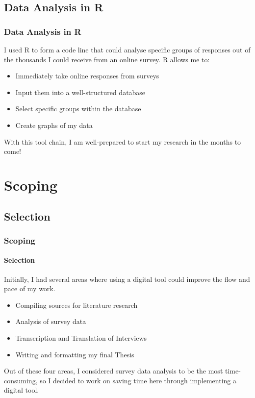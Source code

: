 \documentclass[aspectratio=1610]{beamer}
\begin{document}
\subsection{Data Analysis in R}
\begin{frame}
\frametitle{Data Analysis in R}
I used R to form a code line that could analyse specific groups of responses out of the thousands I could receive from an online survey.
R allows me to:
\begin{itemize}
\item Immediately take online responses from surveys
\item Input them into a well-structured database
\item Select specific groups within the database
\item Create graphs of my data
\end{itemize}
With this tool chain, I am well-prepared to start my research in the months to come!
 \end{frame}
\section{Scoping}
\subsection{Selection}
\begin{frame}
\frametitle{Scoping}
\framesubtitle{Selection}
Initially, I had several areas where using a digital tool could improve the flow and pace of my work.
\begin{itemize}
\item Compiling sources for literature research
\item Analysis of survey data
\item Transcription and Translation of Interviews
\item Writing and formatting my final Thesis
\end{itemize}
Out of these four areas, I considered survey data analysis to be the most time-consuming, so I decided to work on saving time here through implementing a digital tool.
\end{frame}
\end{document}
